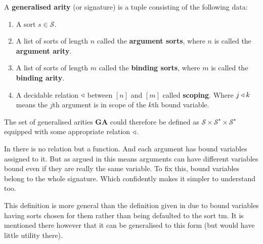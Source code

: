\begin{defin}
    A \textbf{generalised arity} (or signature) is a tuple consisting of the following data:
    
    \begin{enumerate}
         \parsep
        \item A sort $s \in \mathcal{S}$.
        
        \item A list of sorts of length $n$ called the \textbf{argument sorts}, where $n$ is called the \textbf{argument arity}.
        
        \item A list of sorts of length $m$ called the \textbf{binding sorts}, where $m$ is called the \textbf{binding arity}.
        
        \item A decidable relation $\triangleleft$ between $[n]$ and $[m]$ called \textbf{scoping}. Where $j \triangleleft k$ means the $j$th argument is in scope of the $k$th bound variable.
    \end{enumerate}
    
    The set of generalised arities $\mathbf{GA}$ could therefore be defined as $\mathcal{S} \times \mathcal{S}^\star  \times \mathcal{S}^\star$ equipped with some appropriate relation $\triangleleft$.
\end{defin}

\begin{remark}
    In \cite{harper_2016} there is no relation but a function. And each argument has bound variables assigned to it. But as argued in \cite{nlab:initiality_project_-_raw_syntax} this means arguments can have different variables bound even if they are really the same variable. To fix this, bound variables belong to the whole signature. Which confidently makes it simpler to understand too.
    
    This definition is more general than the definition given in \cite{nlab:initiality_project_-_raw_syntax} due to bound variables having sorts chosen for them rather than being defaulted to the sort $\mathrm{tm}$. It is mentioned there however that it can be generalised to this form (but would have little utility there).
\end{remark}

